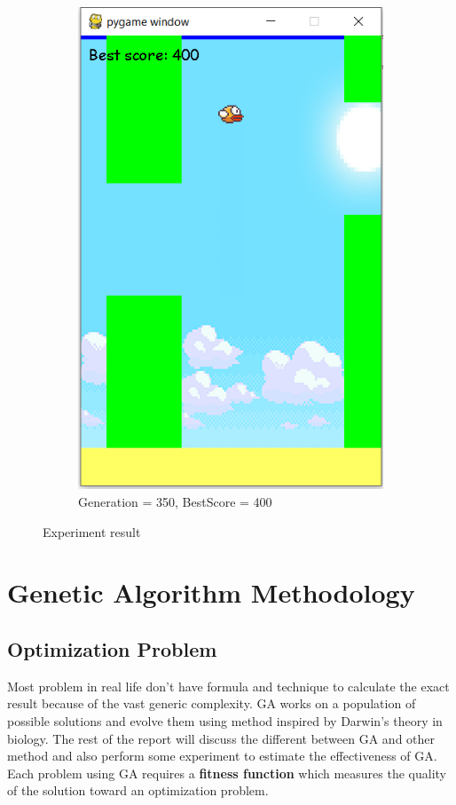 \documentclass[conference]{IEEEtran}
\begin{document}
\begin{figure}[H]
\begin{subfigure}[b]{0.2\textwidth}
        \includegraphics[width=\textwidth]{score400}
        \caption{Generation = 350, BestScore = 400}
        \label{fig:Output}
    \end{subfigure}
    \caption{Experiment result}
\end{figure}

\section{Genetic Algorithm Methodology}
\subsection{Optimization Problem}
Most problem in real life don't have formula and technique to calculate the exact result because of the vast generic complexity. GA works on a population of possible solutions and evolve them using method inspired by Darwin's theory in biology. The rest of the report will discuss the different between GA and other method and also perform some experiment to estimate the effectiveness of GA.\\
\indent
Each problem using GA requires a \textbf{fitness function} which measures the quality of the solution toward an optimization problem.
\end{document}
